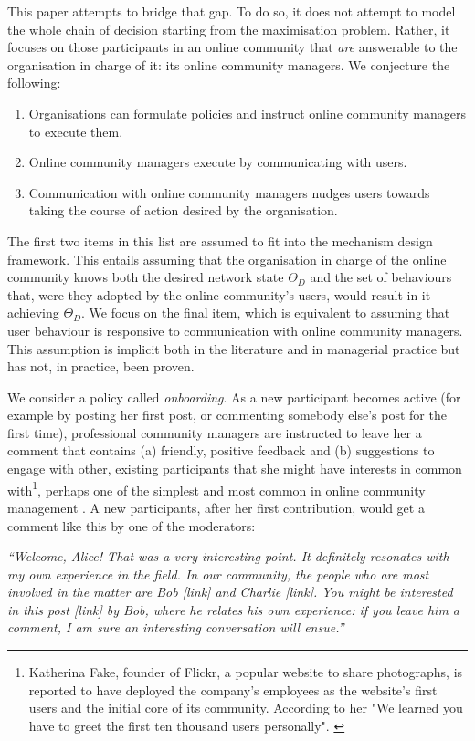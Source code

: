 This paper attempts to bridge that gap. To do so, it does not attempt to model the whole chain of decision starting from the maximisation problem. Rather, it focuses on those participants in an online community that \textit{are} answerable to the organisation in charge of it: its online community managers. We conjecture the following:

\begin{enumerate}
 \item Organisations can formulate policies and instruct online community managers to execute them.
 \item Online community managers execute by communicating with users.
 \item Communication with online community managers nudges users towards taking the course of action desired by the organisation. 
 \end{enumerate}
 
The first two items in this list are assumed to fit into the mechanism design framework. This entails assuming that the organisation in charge of the online community knows both the desired network state $\Theta_D$ and the set of behaviours that, were they adopted by the online community's users, would result in it achieving $\Theta_D$. We focus on the final item, which is equivalent to assuming that user behaviour is responsive to communication with online community managers. This assumption is implicit both in the literature and in managerial practice but has not, in practice, been proven.

We consider a policy called \emph{onboarding}. As a new participant becomes active (for example by posting her first post, or commenting somebody else's post for the first time), professional community managers are instructed to leave her a comment that contains (a) friendly, positive feedback and (b) suggestions to engage with other, existing participants that she might have interests in common with\footnote{Katherina Fake, founder of Flickr, a popular website to share photographs, is reported to have deployed the company's employees as the website's first users and the initial core of its community. According to her "We learned you have to greet the first ten thousand users personally". \cite{shirky2008here}}, perhaps one of the simplest and most common in online community management \cite{rheingold1993virtual, shirky2008here}. A new participants, after her first contribution, would get a comment like this by one of the moderators:

\emph{``Welcome, Alice! That was a very interesting point. It definitely resonates with my own experience in the field. In our community, the people who are most involved in the matter are Bob [link] and Charlie [link]. You might be interested in this post [link] by Bob, where he relates his own experience: if you leave him a comment, I am sure an interesting conversation will ensue.''}

